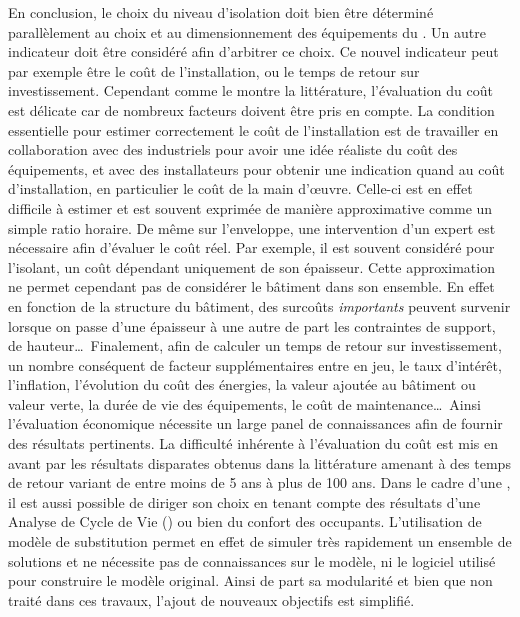 En conclusion, le choix du niveau d’isolation doit bien être déterminé parallèlement au choix
et au dimensionnement des
équipements du . Un autre indicateur doit être considéré afin
d’arbitrer ce choix. Ce nouvel indicateur peut par exemple être le coût de l’installation, ou
le temps de retour sur investissement. Cependant comme le montre la littérature,
l’évaluation du coût est délicate car de nombreux facteurs doivent être pris en compte. La
condition essentielle pour estimer correctement le coût de l’installation est de
travailler en collaboration avec des industriels pour avoir une idée réaliste du coût des
équipements, et avec des installateurs pour obtenir une indication quand au coût
d’installation, en particulier le coût de la main d’œuvre. Celle-ci est en effet difficile
à estimer et est souvent exprimée de manière approximative comme un simple ratio horaire.
De même sur l’enveloppe, une intervention d’un expert est nécessaire afin d’évaluer le
coût réel. Par exemple, il est souvent considéré pour l’isolant, un coût dépendant
uniquement de son épaisseur. Cette approximation ne permet cependant pas de considérer le
bâtiment dans son ensemble. En effet en fonction de la structure du bâtiment, des surcoûts
\emph{importants} peuvent survenir lorsque on passe d’une épaisseur à une autre de part
les contraintes de support, de hauteur\dots\ Finalement, afin de calculer un
temps de retour sur investissement, un nombre conséquent de facteur supplémentaires entre en jeu, le
taux d’intérêt, l’inflation, l’évolution du coût des énergies, la valeur ajoutée au
bâtiment ou valeur verte, la durée de vie des équipements, le coût de maintenance\dots\
Ainsi l’évaluation économique nécessite un large panel de connaissances
afin de fournir des résultats pertinents.
La difficulté inhérente à l’évaluation du coût est mis en avant par les résultats
disparates obtenus dans la littérature amenant à des temps de retour variant de entre moins de
\num{5} ans à plus de \num{100} ans.
Dans le cadre d’une , il est aussi possible de diriger son choix en tenant
compte des résultats d’une Analyse de Cycle de Vie (\abr{ACV}) ou bien du confort des occupants.
L’utilisation de modèle de substitution permet en effet de simuler très rapidement
un ensemble de solutions et ne nécessite pas de connaissances sur le modèle, ni le
logiciel utilisé pour construire le modèle original. Ainsi de part sa modularité
et bien que non traité dans ces travaux, l’ajout de nouveaux objectifs est simplifié.

